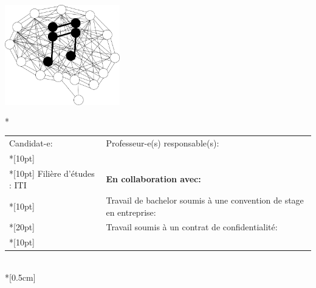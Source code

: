 \begin{spacing}{0.956}
\vfill
\begin{center}
	{\includegraphics[height=5cm,width=5cm]{template/images/abstract/image}}\\*
\vfill

\begin{center}
	{\sf
		\begin{tabular*}{16cm}{p{7.7cm} p{7.7cm}}
			\small Candidat-e:					&	\small Professeur-e(s) responsable(s):\\*[10pt]
			\small\textbf{\textsc{\Author}}		&	\small\textbf{\textsc{\Professor}}\\*[10pt]
			\footnotesize  Filière d’études : ITI	&	\footnotesize  \textbf{En collaboration avec:} \textbf{\Client}\\*[10pt]
			\footnotesize  {} & \footnotesize  Travail de bachelor soumis à une convention de stage en entreprise: \textbf{\Convention}\\*[20pt]
			\footnotesize  {} & \footnotesize  Travail soumis à un contrat de confidentialité: \textbf{\Confidentiel}\\*[10pt]
		\end{tabular*}\\*[0.5cm]
	}
\end{center}

\end{center}
\end{spacing}

